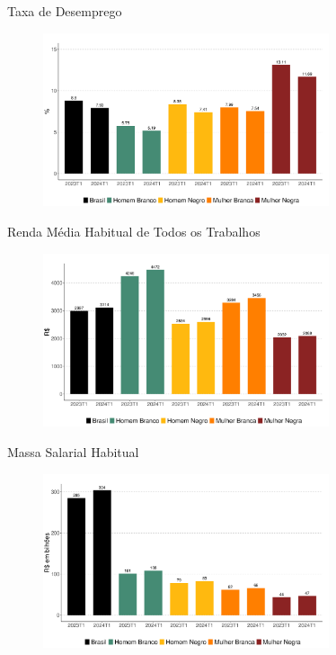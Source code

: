 \documentclass[10pt, xcolor=x11names,compress]{beamer}
\begin{document}
	\begin{frame}{Taxa de Desemprego}
		\begin{figure}
			\centering
			\includegraphics[width = 0.75\textwidth]{figures_output/unemp.pdf}
		\end{figure}
	\end{frame}	
	
		\begin{frame}{Renda Média Habitual de Todos os Trabalhos}
		\begin{figure}
			\centering
			\includegraphics[width = 0.75\textwidth]{figures_output/rendimento_habitual.pdf}
		\end{figure}
	\end{frame}
	
	\begin{frame}{Massa Salarial Habitual}
		\begin{figure}
			\centering
			\includegraphics[width = 0.75\textwidth]{figures_output/massa_habitual.pdf}
		\end{figure}
	\end{frame}
	
\end{document}
